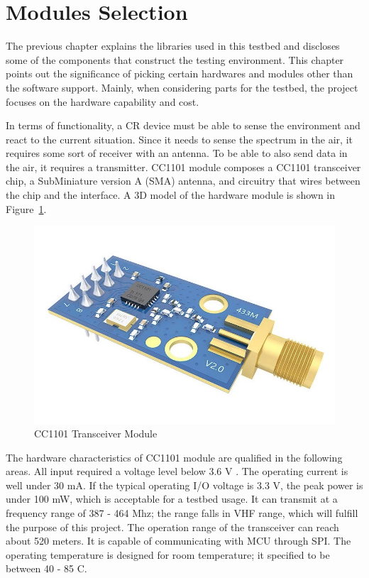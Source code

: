 \section{Modules Selection}

The previous chapter explains the libraries used in this testbed and discloses some of the components that construct the testing environment. This chapter points out the significance of picking certain hardwares and modules other than the software support. Mainly, when considering parts for the testbed, the project focuses on the hardware capability and cost. 

In terms of functionality, a CR device must be able to sense the environment and react to the current situation. Since it needs to sense the spectrum in the air, it requires some sort of receiver with an antenna. To be able to also send data in the air, it requires a transmitter. CC1101 module composes a CC1101 transceiver chip, a SubMiniature version A (SMA) antenna, and circuitry that wires between the chip and the interface. A 3D model of the hardware module is shown in Figure~\ref{fig:cc1101_module}. 

\begin{figure}[ht]
\centering
\includegraphics[width=14cm]{figures/cc1101_module.jpg}
\caption{CC1101 Transceiver Module}
\label{fig:cc1101_module}
\end{figure}

The hardware characteristics of CC1101 module are qualified in the following areas. All input required a voltage level below 3.6 V \cite{cc1101_module}. The operating current is well under 30 mA. If the typical operating I/O voltage is 3.3 V, the peak power is under 100 mW, which is acceptable for a testbed usage. It can transmit at a frequency range of 387 - 464 Mhz; the range falls in VHF range, which will fulfill the purpose of this project. The operation range of the transceiver can reach about 520 meters. It is capable of communicating with MCU through SPI. The operating temperature is designed for room temperature; it specified to be between 40 - 85 \textdegree{}C.


